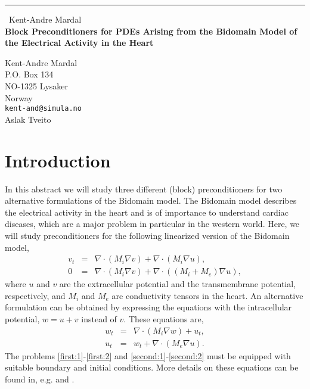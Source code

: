 \documentclass{report}
\begin{document}
\begin{center}
\rule{6in}{1pt} \
{\large Kent-Andre Mardal \\
{\bf Block Preconditioners for PDEs Arising from the Bidomain Model of the Electrical Activity in the Heart}}

Kent-Andre Mardal \\ P.O. Box 134 \\ NO-1325 Lysaker \\ Norway
\\
{\tt kent-and@simula.no}\\
Aslak Tveito\end{center}

\usepackage{amssymb}
\usepackage{bm}
\usepackage{epsfig}
\usepackage{amscd}
\newtheorem{theorem}{Theorem}[section]
\newtheorem{lemma}{Lemma}[section]
\newtheorem{remark}{Remark}[section]
\newtheorem{corollary}{Corollary}[section]
\renewcommand{\AA}{\mathcal{A}}
\newcommand{\BB}{\mathcal{B}}
\newcommand{\xx}{\mathcal{x}}
\newcommand{\bb}{\mathcal{b}}


\long{}



\section{Introduction}

In this abstract we will study three different (block) preconditioners for
two alternative formulations of the Bidomain model.
The Bidomain model describes the electrical activity in
the heart and is of importance to understand cardiac
diseases, which are a major problem in particular in
the western world. Here, we will study preconditioners
for the following linearized version of the Bidomain model,
\begin{eqnarray}
\label{first:1}
v_t &=& \nabla\cdot(M_i\nabla v)+\nabla\cdot(M_i\nabla u),\\
\label{first:2}
0 &=& \nabla\cdot(M_i\nabla v)+\nabla\cdot((M_i+M_e)\nabla u),
\end{eqnarray}
where $u$ and $v$ are the extracellular potential and the transmembrane
potential, respectively,
and $M_i$ and $M_e$ are conductivity tensors in the heart.
An alternative formulation can be obtained by expressing the
equations with the intracellular potential, $w = u +v $ instead of $v$.
These equations are,
\begin{eqnarray}
\label{second:1}
w_t &=& \nabla\cdot(M_i\nabla w)+ u_t ,\\
\label{second:2}
u_t &=& w_t+\nabla\cdot(M_e\nabla u).
\end{eqnarray}
The problems \eqref{first:1}-\eqref{first:2}
and \eqref{second:1}-\eqref{second:2} must
be equipped with suitable boundary and initial
conditions.
More details on these equations can
be found in, e.g. \cite{Pennacchio} and \cite{block-mg}.
\end{document}
